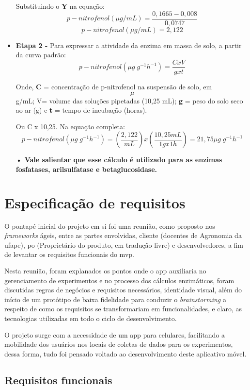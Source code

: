 \begin{itemize}
    Substituindo o \textbf{Y} na equação:
    \[p-nitrofenol (\mu g/mL) = \frac{0,1665 - 0,008}{0,0747}\]
    \[p-nitrofenol (\mu g/mL) = 2,122\]
    

   \item \textbf{Etapa 2 -} Para expressar a atividade da enzima em massa de solo, a partir da curva padrão:
    \[p-nitrofenol (\mu g\;g^{-1} h^{-1}) = \frac{C x V}{g x t}\]

    Onde, \textbf{C} = concentração de p-nitrofenol na suspensão de solo, em \[\mu\] g/mL; V= volume das soluções pipetadas (10,25 mL); \textbf{g} = peso do solo seco ao ar (g) e \textbf{t} = tempo de incubação (horas).

    Ou C x 10,25. Na equação completa:
    \[p-nitrofenol (\mu g\;g^{-1} h^{-1}) = \left(\frac{2,122}{mL} \right)x\left(\frac{10,25 mL}{1g x 1h} \right) = 21,75 \mu g\;g^{-1} h^{-1} \]

    \textbf{• Vale salientar que esse cálculo é utilizado para as enzimas fosfatases, arilsulfatase e betaglucosidase.}
    
 \end{itemize}


\section{Especificação de requisitos}\label{sec:especificacao_de_requisitos}

O pontapé inicial do projeto em si foi uma reunião, como proposto nos \textit{frameworks} ágeis, entre as partes envolvidas, cliente (docentes de Agronomia da \ac{ufape}), \ac{po} (Proprietário do produto, em tradução livre) e desenvolvedores, a fim de levantar os requisitos funcionais do \ac{mvp}. 

Nesta reunião, foram explanados os pontos onde o \ac{app} auxiliaria no gerenciamento de experimentos e no processo dos cálculos enzimáticos, foram discutidas regras de negócios e requisitos necessários, identidade visual, além do início de um protótipo de baixa fidelidade para conduzir o \textit{brainstorming} a respeito de como os requisitos se transformariam em funcionalidades, e claro, as tecnologias utilizadas em todo o ciclo de desenvolvimento.

O projeto surge com a necessidade de um \ac{app} para celulares, facilitando a mobilidade dos usuários nos locais de coletas de dados para os experimentos, dessa forma, tudo foi pensado voltado ao desenvolvimento deste aplicativo móvel.

\subsection{Requisitos funcionais}\label{ssec:requisitos_funcionais}

